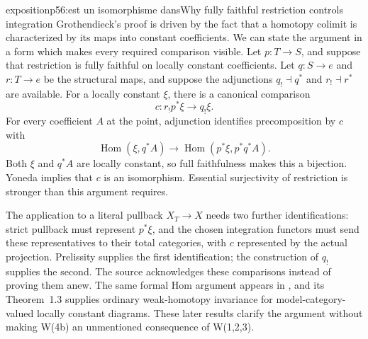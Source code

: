 \begin{dcomment}{exposition}{p56:est un isomorphisme dans}{Why fully faithful restriction controls integration}
Grothendieck's proof is driven by the fact that a homotopy colimit is characterized by its maps into constant coefficients. We can state the argument in a form which makes every required comparison visible. Let $p:T\to S$, and suppose that restriction is fully faithful on locally constant coefficients. Let $q:S\to e$ and $r:T\to e$ be the structural maps, and suppose the adjunctions $q_!\dashv q^*$ and $r_!\dashv r^*$ are available. For a locally constant $\xi$, there is a canonical comparison
\[
 c:r_!p^*\xi\longrightarrow q_!\xi.
\]
For every coefficient $A$ at the point, adjunction identifies precomposition by $c$ with
\[
 \operatorname{Hom}(\xi,q^*A)
 \longrightarrow
 \operatorname{Hom}(p^*\xi,p^*q^*A).
\]
Both $\xi$ and $q^*A$ are locally constant, so full faithfulness makes this a bijection. Yoneda implies that $c$ is an isomorphism. Essential surjectivity of restriction is stronger than this argument requires.

The application to a literal pullback $X_T\to X$ needs two further identifications: strict pullback must represent $p^*\xi$, and the chosen integration functors must send these representatives to their total categories, with $c$ represented by the actual projection. Prelissity supplies the first identification; the construction of $q_!$ supplies the second. The source acknowledges these comparisons instead of proving them anew. The same formal Hom argument appears in \citet[Proposition~1.10]{Cisinski2009LocallyConstant}, and its Theorem~1.3 supplies ordinary weak-homotopy invariance for model-category-valued locally constant diagrams. These later results clarify the argument without making W(4b) an unmentioned consequence of W(1,2,3).
\end{dcomment}

